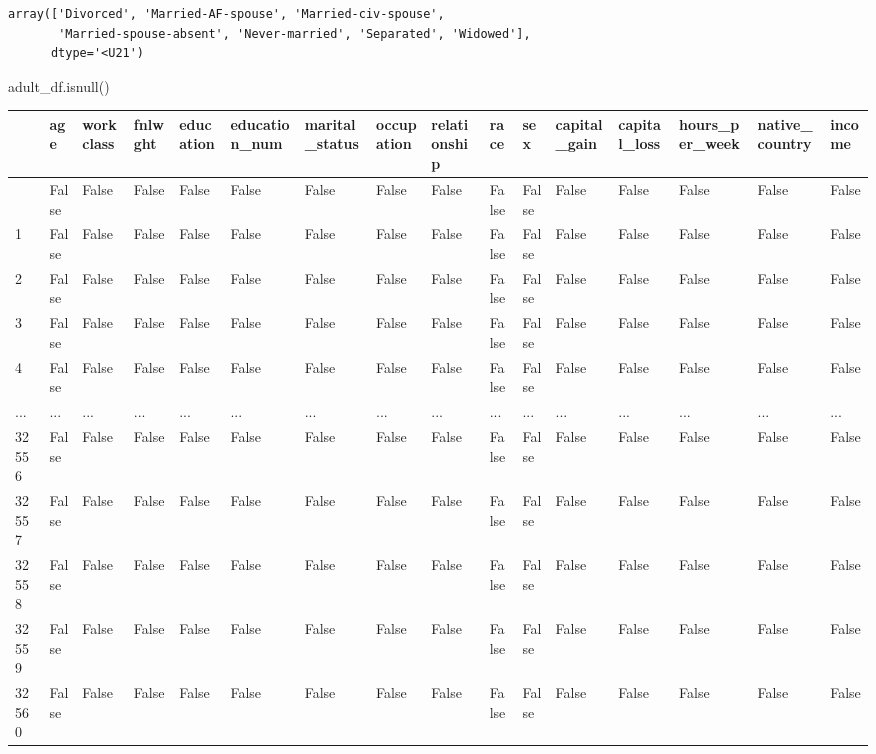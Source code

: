 \documentclass[
  letterpaper,
  DIV=11,
  numbers=noendperiod]{scrartcl}
\newenvironment{Shaded}{\begin{snugshade}}{\end{snugshade}}
\newcommand{\NormalTok}[1]{\textcolor[rgb]{0.00,0.23,0.31}{#1}}
\begin{document}
\begin{verbatim}
array(['Divorced', 'Married-AF-spouse', 'Married-civ-spouse',
       'Married-spouse-absent', 'Never-married', 'Separated', 'Widowed'],
      dtype='<U21')
\end{verbatim}

\begin{Shaded}
\begin{Highlighting}[]
\NormalTok{adult\_df.isnull()}
\end{Highlighting}
\end{Shaded}

\begin{longtable}[]{@{}llllllllllllllll@{}}
\toprule\noalign{}
& age & workclass & fnlwght & education & education\_num &
marital\_status & occupation & relationship & race & sex & capital\_gain
& capital\_loss & hours\_per\_week & native\_country & income \\
\midrule\noalign{}
\endhead
\bottomrule\noalign{}
\endlastfoot
0 & False & False & False & False & False & False & False & False &
False & False & False & False & False & False & False \\
1 & False & False & False & False & False & False & False & False &
False & False & False & False & False & False & False \\
2 & False & False & False & False & False & False & False & False &
False & False & False & False & False & False & False \\
3 & False & False & False & False & False & False & False & False &
False & False & False & False & False & False & False \\
4 & False & False & False & False & False & False & False & False &
False & False & False & False & False & False & False \\
... & ... & ... & ... & ... & ... & ... & ... & ... & ... & ... & ... &
... & ... & ... & ... \\
32556 & False & False & False & False & False & False & False & False &
False & False & False & False & False & False & False \\
32557 & False & False & False & False & False & False & False & False &
False & False & False & False & False & False & False \\
32558 & False & False & False & False & False & False & False & False &
False & False & False & False & False & False & False \\
32559 & False & False & False & False & False & False & False & False &
False & False & False & False & False & False & False \\
32560 & False & False & False & False & False & False & False & False &
False & False & False & False & False & False & False \\
\end{longtable}
\end{document}
